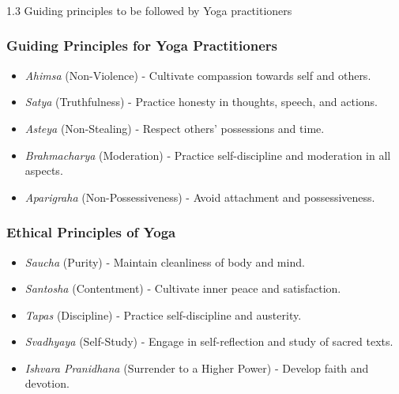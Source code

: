 \begin{frame}[fragile]\frametitle{}
\begin{center}
{\Large 1.3 Guiding principles to be followed by Yoga practitioners}
\end{center}
\end{frame}

\begin{frame}[fragile]\frametitle{Guiding Principles for Yoga Practitioners}

      \begin{itemize}
		\item \textit{Ahimsa} (Non-Violence) - Cultivate compassion towards self and others.
		\item \textit{Satya} (Truthfulness) - Practice honesty in thoughts, speech, and actions.
		\item \textit{Asteya} (Non-Stealing) - Respect others' possessions and time.
		\item \textit{Brahmacharya} (Moderation) - Practice self-discipline and moderation in all aspects.
		\item \textit{Aparigraha} (Non-Possessiveness) - Avoid attachment and possessiveness.
	  \end{itemize}

\end{frame}

\begin{frame}[fragile]\frametitle{Ethical Principles of Yoga}

      \begin{itemize}
		\item \textit{Saucha} (Purity) - Maintain cleanliness of body and mind.
		\item \textit{Santosha} (Contentment) - Cultivate inner peace and satisfaction.
		\item \textit{Tapas} (Discipline) - Practice self-discipline and austerity.
		\item \textit{Svadhyaya} (Self-Study) - Engage in self-reflection and study of sacred texts.
		\item \textit{Ishvara Pranidhana} (Surrender to a Higher Power) - Develop faith and devotion.
	  \end{itemize}

\end{frame}

